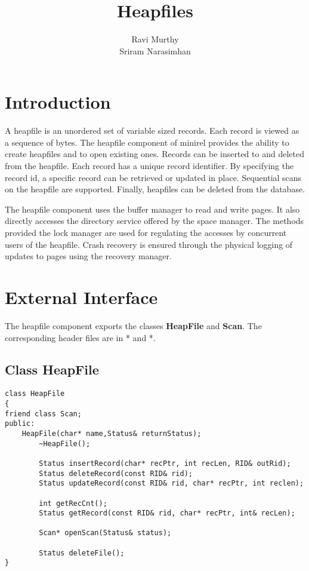 \title{Heapfiles}
\author{Ravi Murthy \\
        Sriram Narasimhan}
\date{}

\maketitle

\section{Introduction}

A heapfile is an unordered set of  variable sized records. Each record
is viewed  as a sequence of bytes.  The  heapfile component of minirel
provides the  ability to create  heapfiles and to open  existing ones.
Records can be inserted to and  deleted from the heapfile. Each record
has  a  unique  record  identifier.  By  specifying the   record id, a
specific   record can be retrieved or    updated in place.  Sequential
scans on    the heapfile are  supported.   Finally,  heapfiles  can be
deleted from the database.

The heapfile  component uses the  buffer   manager to  read and  write
pages. It also directly accesses the directory  service offered by the
space   manager. The methods  provided  the lock manager  are used for
regulating the  accesses  by concurrent users  of  the heapfile. Crash
recovery is ensured through the  physical logging of updates to  pages
using the recovery manager.


\section{External Interface}

The heapfile  component  exports the  classes  {\bf HeapFile} and {\bf
Scan}. The corresponding header files are in * and *.


\subsection{Class HeapFile}

\begin{verbatim}
class HeapFile 
{
friend class Scan;
public:
	HeapFile(char* name,Status& returnStatus); 
        ~HeapFile();                      

        Status insertRecord(char* recPtr, int recLen, RID& outRid); 
        Status deleteRecord(const RID& rid); 
        Status updateRecord(const RID& rid, char* recPtr, int reclen);

        int getRecCnt();
        Status getRecord(const RID& rid, char* recPtr, int& recLen); 
	
        Scan* openScan(Status& status);

        Status deleteFile();
}
\end{verbatim}

